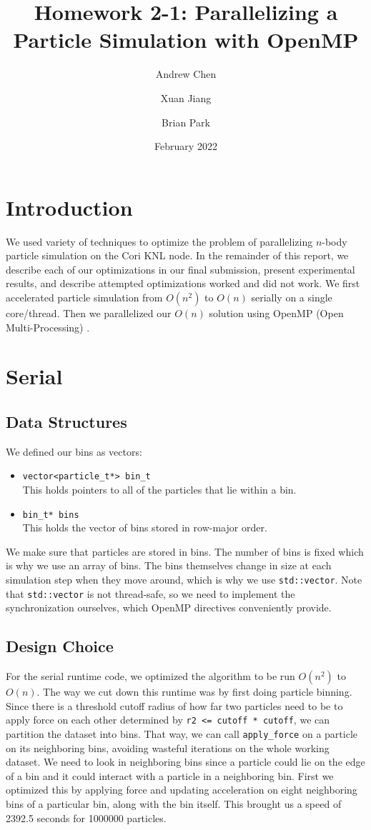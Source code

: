 \documentclass{article}
\title{Homework 2-1: Parallelizing a Particle Simulation with OpenMP}
\author{Andrew Chen}
\author{Xuan Jiang}
\author{Brian Park}
\affil{UC Berkeley, Computer Science 267}
\date{February 2022}
\begin{document}
\maketitle
\section{Introduction}
We used variety of techniques to optimize the problem of parallelizing $n$-body particle simulation on the Cori KNL node. In the remainder of this report, we describe each of our optimizations in our final submission, present experimental results, and describe attempted optimizations worked and did not work. We first accelerated particle simulation from $O(n^2)$ to $O(n)$ serially on a single core/thread. Then we parallelized our $O(n)$ solution using OpenMP (Open Multi-Processing) \cite{openmp}.

\section{Serial}

\subsection{Data Structures}
We defined our bins as vectors:

\begin{itemize}
	\item \verb|vector<particle_t*> bin_t| \\
	      This holds pointers to all of the particles that lie within a bin.
	\item \verb|bin_t* bins| \\
	      This holds the vector of bins stored in row-major order.
\end{itemize}

We make sure that particles are stored in bins. The number of bins is fixed which is why we use an array of bins. The bins themselves change in size at each simulation step when they move around, which is why we use \verb|std::vector|. Note that \verb|std::vector| is not thread-safe, so we need to implement the synchronization ourselves, which OpenMP directives conveniently provide.

\subsection{Design Choice}
For the serial runtime code, we optimized the algorithm to be run $O(n^2)$ to $O(n)$. The way we cut down this runtime was by first doing particle binning. Since there is a threshold cutoff radius of how far two particles need to be to apply force on each other determined by \verb|r2 <= cutoff * cutoff|, we can partition the dataset into bins. That way, we can call \verb|apply_force| on a particle on its neighboring bins, avoiding wasteful iterations on the whole working dataset. We need to look in neighboring bins since a particle could lie on the edge of a bin and it could interact with a particle in a neighboring bin. First we optimized this by applying force and updating acceleration on eight neighboring bins of a particular bin, along with the bin itself. This brought us a speed of 2392.5 seconds for 1000000 particles.
\end{document}
